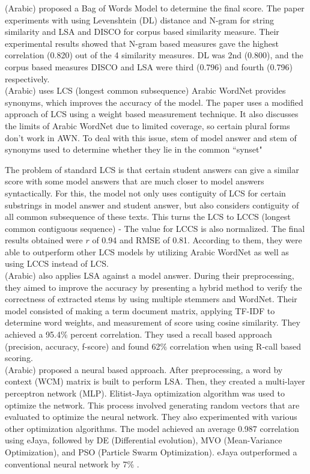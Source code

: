 \documentclass{article}
\begin{document}
	\textbf{\textcite{3_shehab2018arabicsimiliarity}} (Arabic) proposed a Bag of Words Model to determine the final score. The paper experiments with using Levenshtein (DL) distance and N-gram for  string similarity and LSA and DISCO for corpus based similarity measure. Their experimental results showed that N-gram based measures gave the highest correlation (0.820) out of the 4 similarity measures. DL was 2nd (0.800), and the corpus based measures DISCO and LSA were third (0.796) and fourth (0.796) respectively. \\
	
	\textbf{\textcite{8_abdel2021lcs}} (Arabic) uses LCS (longest common subsequence) 
	Arabic WordNet provides synonyms, which improves the accuracy of the model. The paper uses a modified approach of LCS using a weight based measurement technique.
	It also discusses the limits of Arabic WordNet due to limited coverage, so certain plural forms don't work in AWN. To deal with this issue, stem of model answer and stem of synonyms used to determine whether they lie in the common ``synset"
	
	The problem of standard LCS is that certain student answers can give a similar score with some model answers that are much closer to model answers syntactically. For this, the model not only uses contiguity of LCS for certain substrings in model answer and student answer, but also considers contiguity of all common subsequence of these texts. This turns the LCS to LCCS (longest common contiguous sequence) - The value for LCCS is also normalized. The final results obtained were $r$ of 0.94 and RMSE of 0.81. According to them, they were able to outperform other LCS models by utilizing Arabic WordNet as well as using LCCS instead of LCS. \\
	
	\textbf{\textcite{16_rababah2017short}} (Arabic) also applies LSA against a model answer. During their preprocessing, they aimed to improve the accuracy by presenting a hybrid method to verify the correctness of extracted stems by using multiple stemmers and WordNet. Their model consisted of making a term document matrix, applying TF-IDF to determine word weights, and measurement of score using cosine similarity. They achieved a 95.4\% percent correlation. They used a recall based approach (precision, accuracy, f-score) and found 62\% correlation when using R-call based scoring. \\
	
	\textbf{\textcite{27_gaheen2021jaya}} (Arabic) proposed a neural based approach. After preprocessing, a word by context (WCM) matrix is built to perform LSA. Then, they created a multi-layer perceptron network (MLP). Elitist-Jaya optimization algorithm was used to optimize the network. This process involved generating random vectors that are evaluated to optimize the neural network. They also experimented with various other optimization algorithms. The model achieved an average 0.987 correlation using eJaya, followed by DE (Differential evolution), MVO (Mean-Variance Optimization), and PSO (Particle Swarm Optimization). eJaya outperformed a conventional neural network by 7\% . 
\end{document}
